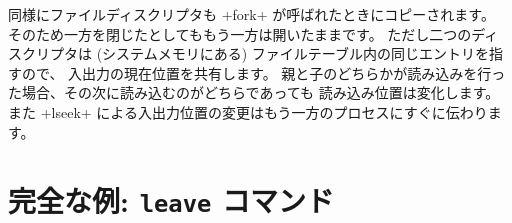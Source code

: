 同様にファイルディスクリプタも \ml+fork+ が呼ばれたときにコピーされます。
そのため一方を閉じたとしてももう一方は開いたままです。
ただし二つのディスクリプタは (システムメモリにある) ファイルテーブル内の同じエントリを指すので、
入出力の現在位置を共有します。
親と子のどちらかが読み込みを行った場合、その次に読み込むのがどちらであっても
読み込み位置は変化します。また \ml+lseek+ による入出力位置の変更はもう一方のプロセスにすぐに伝わります。


\section{完全な例: {\normalfont\texttt{leave}} コマンド}

